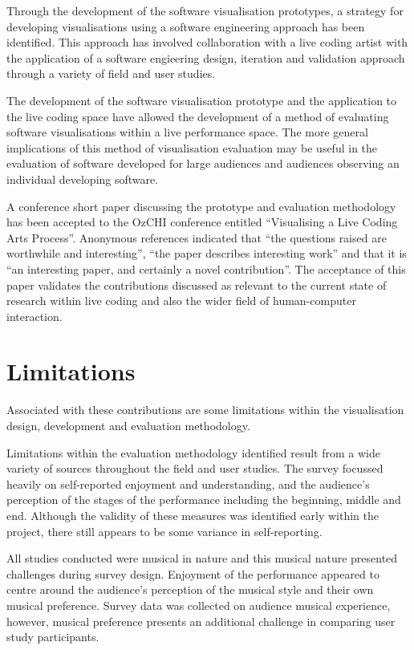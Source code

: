 Through the development of the software visualisation prototypes, a strategy for developing visualisations using a software engineering approach has been identified. This approach has involved collaboration with a live coding artist with the application of a software engieering design, iteration and validation approach through a variety of field and user studies.

The development of the software visualisation prototype and the application to the live coding space have allowed the development of a method of evaluating software visualisations within a live performance space. The more general implications of this method of visualisation evaluation may be useful in the evaluation of software developed for large audiences and audiences observing an individual developing software.

A conference short paper discussing the prototype and evaluation methodology has been accepted to the OzCHI conference entitled ``Visualising a Live Coding Arts Process''. Anonymous references indicated that ``the questions raised are worthwhile and interesting'', ``the paper describes interesting work'' and that it is ``an interesting paper, and certainly a novel contribution''. The acceptance of this paper validates the contributions discussed as relevant to the current state of research within live coding and also the wider field of human-computer interaction.

\section{Limitations}

Associated with these contributions are some limitations within the visualisation design, development and evaluation methodology.

Limitations within the evaluation methodology identified result from a wide variety of sources throughout the field and user studies. The survey focussed heavily on self-reported enjoyment and understanding, and the audience's perception of the stages of the performance including the beginning, middle and end. Although the validity of these measures was identified early within the project, there still appears to be some variance in self-reporting.

All studies conducted were musical in nature and this musical nature presented challenges during survey design. Enjoyment of the performance appeared to centre around the audience's perception of the musical style and their own musical preference. Survey data was collected on audience musical experience, however, musical preference presents an additional challenge in comparing user study participants.

